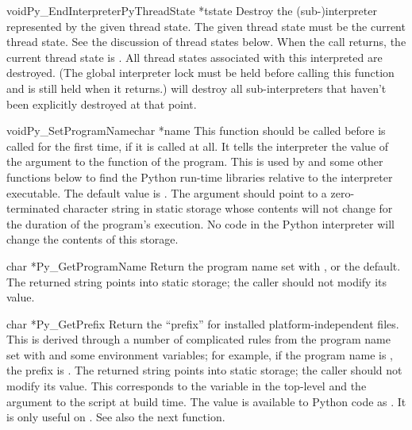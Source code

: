 \documentclass[twoside,openright]{report}
\begin{document}
\begin{cfuncdesc}{void}{Py_EndInterpreter}{PyThreadState *tstate}
Destroy the (sub-)interpreter represented by the given thread state.  
The given thread state must be the current thread state.  See the 
discussion of thread states below.  When the call returns, the current 
thread state is \NULL{}.  All thread states associated with this 
interpreted are destroyed.  (The global interpreter lock must be held 
before calling this function and is still held when it returns.)  
 will destroy all sub-interpreters that haven't 
been explicitly destroyed at that point.
\end{cfuncdesc}

\begin{cfuncdesc}{void}{Py_SetProgramName}{char *name}
This function should be called before  is called 
for the first time, if it is called at all.  It tells the interpreter 
the value of the  argument to the  function 
of the program.  This is used by  and some other 
functions below to find the Python run-time libraries relative to the 
interpreter executable.  The default value is .  The 
argument should point to a zero-terminated character string in static 
storage whose contents will not change for the duration of the 
program's execution.  No code in the Python interpreter will change 
the contents of this storage.
\end{cfuncdesc}

\begin{cfuncdesc}{char *}{Py_GetProgramName}{}
Return the program name set with , or the 
default.  The returned string points into static storage; the caller 
should not modify its value.
\end{cfuncdesc}

\begin{cfuncdesc}{char *}{Py_GetPrefix}{}
Return the ``prefix'' for installed platform-independent files.  This 
is derived through a number of complicated rules from the program name 
set with  and some environment variables; 
for example, if the program name is , 
the prefix is .  The returned string points into 
static storage; the caller should not modify its value.  This 
corresponds to the  variable in the top-level 
 and the  argument to the 
 script at build time.  The value is available to 
Python code as .  It is only useful on \UNIX{}.  See 
also the next function.
\end{cfuncdesc}
\end{document}
